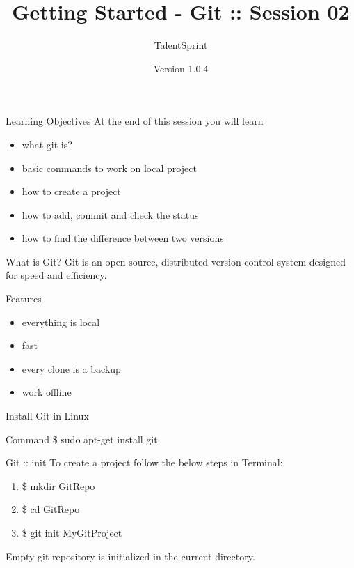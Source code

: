 \documentclass[14pt]{beamer}
\title[BPT:VCS:02]{Getting Started - Git :: Session 02}
\author[TS]{TalentSprint}
\institute[L\&D]{Licensed To Skill}
\date{Version 1.0.4}
\begin{document}
\begin{frame}
  \titlepage
\end{frame}

\begin{frame}{Learning Objectives}
At the end of this session you will learn
  \begin{itemize}
  \item what git is?
  \item basic commands to work on local project
  \item how to create a project
  \item how to add, commit and check the status
  \item how to find the difference between two versions
  \end{itemize}
\end{frame}

\begin{frame}{What is Git?}
Git is an open source, distributed version control system designed for speed and efficiency.
\end{frame}

\begin{frame}{Features}
\begin{itemize}
\item everything is local
\pause
\item fast
\pause
\item every clone is a backup
\pause
\item work offline
\end{itemize}
\end{frame}

\begin{frame}{Install Git in Linux}
\begin{block} {Command}
\$ sudo apt-get install git
\end{block}
\end{frame}

\begin{frame}{Git :: init}
To create a project follow the below steps in Terminal:
\begin{enumerate}
\item \$ mkdir GitRepo
\item \$ cd GitRepo
\item \$ git init MyGitProject 
\end{enumerate}
\begin{block}{}
Empty git repository is initialized in the current directory.
\end{block}
\end{frame}
\end{document}
